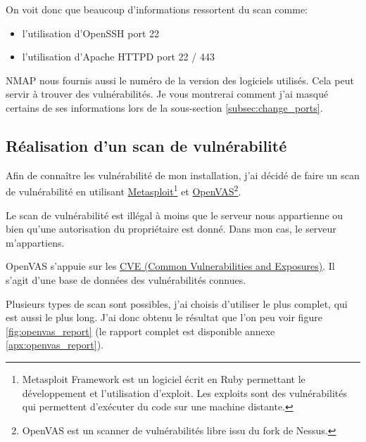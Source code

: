 \documentclass[]{report}
\begin{document}
      On voit donc que beaucoup d'informations ressortent du scan comme:

      \begin{itemize}
        \item l'utilisation d'OpenSSH port 22
        \item l'utilisation d'Apache HTTPD port 22 / 443
      \end{itemize}

      NMAP nous fournis aussi le numéro de la version des logiciels utilisés. Cela peut servir à trouver des vulnérabilités. Je vous montrerai comment j'ai masqué certains de ses informations lors de la sous-section \ref{subsec:change_ports}.

    \subsection{Réalisation d'un scan de vulnérabilité}

      Afin de connaître les vulnérabilité de mon installation, j'ai décidé de faire un scan de vulnérabilité en utilisant \href{https://www.metasploit.com/}{Metasploit}\footnote{Metasploit Framework est un logiciel écrit en Ruby permettant le développement et l’utilisation d'exploit. Les exploits sont des vulnérabilités qui permettent d’exécuter du code sur une machine distante.} et \href{http://www.openvas.org/}{OpenVAS}\footnote{OpenVAS est un scanner de vulnérabilités libre issu du fork de Nessus.}.

      Le scan de vulnérabilité est illégal à moins que le serveur nous appartienne ou bien qu'une autorisation du propriétaire est donné. Dans mon cas, le serveur m’appartiens.

      OpenVAS s'appuie sur les \href{https://cve.mitre.org/}{CVE (Common Vulnerabilities and Exposures)}. Il s'agit d'une base de données des vulnérabilités connues.

      Plusieurs types de scan sont possibles, j'ai choisis d'utiliser le plus complet, qui est aussi le plus long. J'ai donc obtenu le résultat que l'on peu voir figure \ref{fig:openvas_report} (le rapport complet est disponible annexe \ref{apx:openvas_report}).
\end{document}
